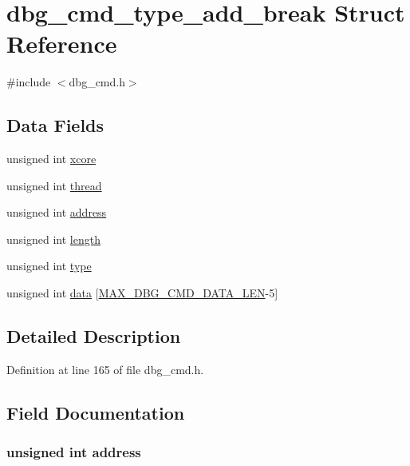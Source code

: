 \hypertarget{structdbg__cmd__type__add__break}{\section{dbg\-\_\-cmd\-\_\-type\-\_\-add\-\_\-break Struct Reference}
\label{structdbg__cmd__type__add__break}
}


{\ttfamily \#include $<$dbg\-\_\-cmd.\-h$>$}

\subsection*{Data Fields}
\begin{DoxyCompactItemize}
\item 
unsigned int \hyperlink{structdbg__cmd__type__add__break_a78357326dd562d441c3c73f5676ac638}{xcore}
\item 
unsigned int \hyperlink{structdbg__cmd__type__add__break_a13f572e7828e1694c6f9c9c78bf7d8f5}{thread}
\item 
unsigned int \hyperlink{structdbg__cmd__type__add__break_a2f55ff1f6cd45ca1b6431493ab5614eb}{address}
\item 
unsigned int \hyperlink{structdbg__cmd__type__add__break_ac8d42bcd4a44e078047ccd7291059238}{length}
\item 
unsigned int \hyperlink{structdbg__cmd__type__add__break_a4bfea42429249a1f65204f0c0f34704a}{type}
\item 
unsigned int \hyperlink{structdbg__cmd__type__add__break_ab91dff01c2f12e354ddb4becbe93f063}{data} \mbox{[}\hyperlink{dbg__cmd_8h_a4552ec15033c8a68870cdf80eda5470c}{M\-A\-X\-\_\-\-D\-B\-G\-\_\-\-C\-M\-D\-\_\-\-D\-A\-T\-A\-\_\-\-L\-E\-N}-\/5\mbox{]}
\end{DoxyCompactItemize}


\subsection{Detailed Description}


Definition at line 165 of file dbg\-\_\-cmd.\-h.



\subsection{Field Documentation}
\hypertarget{structdbg__cmd__type__add__break_a2f55ff1f6cd45ca1b6431493ab5614eb}{
\subsubsection[{address}]{\setlength{\rightskip}{0pt plus 5cm}unsigned int address}}\label{structdbg__cmd__type__add__break_a2f55ff1f6cd45ca1b6431493ab5614eb}


